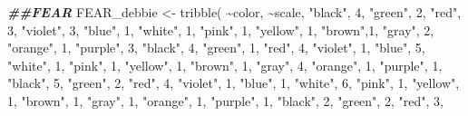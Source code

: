 \documentclass[
]{article}
\newenvironment{Shaded}{\begin{snugshade}}{\end{snugshade}}
\newcommand{\DecValTok}[1]{\textcolor[rgb]{0.00,0.00,0.81}{#1}}
\newcommand{\DocumentationTok}[1]{\textcolor[rgb]{0.56,0.35,0.01}{\textbf{\textit{#1}}}}
\newcommand{\FunctionTok}[1]{\textcolor[rgb]{0.00,0.00,0.00}{#1}}
\newcommand{\NormalTok}[1]{#1}
\newcommand{\OtherTok}[1]{\textcolor[rgb]{0.56,0.35,0.01}{#1}}
\newcommand{\SpecialCharTok}[1]{\textcolor[rgb]{0.00,0.00,0.00}{#1}}
\newcommand{\StringTok}[1]{\textcolor[rgb]{0.31,0.60,0.02}{#1}}
\begin{document}
\begin{Shaded}
\begin{Highlighting}[]
\DocumentationTok{\#\#FEAR}
\NormalTok{FEAR\_debbie }\OtherTok{\textless{}{-}} \FunctionTok{tribble}\NormalTok{(}
  \SpecialCharTok{\textasciitilde{}}\NormalTok{color, }\SpecialCharTok{\textasciitilde{}}\NormalTok{scale,}
  \StringTok{"black"}\NormalTok{, }\DecValTok{4}\NormalTok{,}
  \StringTok{"green"}\NormalTok{, }\DecValTok{2}\NormalTok{,}
  \StringTok{"red"}\NormalTok{, }\DecValTok{3}\NormalTok{,}
  \StringTok{"violet"}\NormalTok{, }\DecValTok{3}\NormalTok{,}
  \StringTok{"blue"}\NormalTok{, }\DecValTok{1}\NormalTok{,}
  \StringTok{"white"}\NormalTok{, }\DecValTok{1}\NormalTok{,}
  \StringTok{"pink"}\NormalTok{, }\DecValTok{1}\NormalTok{,}
  \StringTok{"yellow"}\NormalTok{, }\DecValTok{1}\NormalTok{,}
  \StringTok{"brown"}\NormalTok{,}\DecValTok{1}\NormalTok{,}
  \StringTok{"gray"}\NormalTok{, }\DecValTok{2}\NormalTok{,}
  \StringTok{"orange"}\NormalTok{, }\DecValTok{1}\NormalTok{,}
  \StringTok{"purple"}\NormalTok{, }\DecValTok{3}\NormalTok{,}
  \StringTok{"black"}\NormalTok{, }\DecValTok{4}\NormalTok{,}
\StringTok{"green"}\NormalTok{, }\DecValTok{1}\NormalTok{,}
  \StringTok{"red"}\NormalTok{, }\DecValTok{4}\NormalTok{,}
  \StringTok{"violet"}\NormalTok{, }\DecValTok{1}\NormalTok{,}
  \StringTok{"blue"}\NormalTok{, }\DecValTok{5}\NormalTok{,}
  \StringTok{"white"}\NormalTok{, }\DecValTok{1}\NormalTok{,}
  \StringTok{"pink"}\NormalTok{, }\DecValTok{1}\NormalTok{,}
  \StringTok{"yellow"}\NormalTok{, }\DecValTok{1}\NormalTok{,}
  \StringTok{"brown"}\NormalTok{, }\DecValTok{1}\NormalTok{,}
  \StringTok{"gray"}\NormalTok{, }\DecValTok{4}\NormalTok{,}
  \StringTok{"orange"}\NormalTok{, }\DecValTok{1}\NormalTok{,}
  \StringTok{"purple"}\NormalTok{, }\DecValTok{1}\NormalTok{,}
    \StringTok{"black"}\NormalTok{, }\DecValTok{5}\NormalTok{,}
  \StringTok{"green"}\NormalTok{, }\DecValTok{2}\NormalTok{,}
  \StringTok{"red"}\NormalTok{, }\DecValTok{4}\NormalTok{,}
  \StringTok{"violet"}\NormalTok{, }\DecValTok{1}\NormalTok{,}
  \StringTok{"blue"}\NormalTok{, }\DecValTok{1}\NormalTok{,}
  \StringTok{"white"}\NormalTok{, }\DecValTok{6}\NormalTok{,}
  \StringTok{"pink"}\NormalTok{, }\DecValTok{1}\NormalTok{,}
  \StringTok{"yellow"}\NormalTok{, }\DecValTok{1}\NormalTok{,}
  \StringTok{"brown"}\NormalTok{, }\DecValTok{1}\NormalTok{,}
  \StringTok{"gray"}\NormalTok{, }\DecValTok{1}\NormalTok{,}
  \StringTok{"orange"}\NormalTok{, }\DecValTok{1}\NormalTok{,}
  \StringTok{"purple"}\NormalTok{, }\DecValTok{1}\NormalTok{,}
    \StringTok{"black"}\NormalTok{, }\DecValTok{2}\NormalTok{,}
  \StringTok{"green"}\NormalTok{, }\DecValTok{2}\NormalTok{,}
  \StringTok{"red"}\NormalTok{, }\DecValTok{3}\NormalTok{,}

\end{Highlighting}
\end{Shaded}
\end{document}
